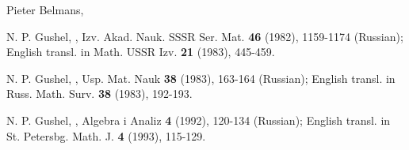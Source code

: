 \documentclass[11pt]{amsart}
\theoremstyle{plain}
\theoremstyle{definition}
\theoremstyle{expl}
\begin{document}
\begin{thebibliography}{12}
Pieter Belmans,

N. P. Gushel,
,
\newblock Izv. Akad. Nauk. SSSR Ser. Mat. \textbf{46} (1982), 1159-1174 (Russian); English transl. in Math. USSR  Izv. \textbf{21} (1983), 445-459.

N. P. Gushel,
,
\newblock Usp. Mat. Nauk \textbf{38} (1983), 163-164 (Russian); English transl. in Russ. Math. Surv. \textbf{38} (1983), 192-193. 

N. P. Gushel,
,
\newblock Algebra i Analiz \textbf{4} (1992), 120-134 (Russian); English transl. in St. Petersbg. Math. J. \textbf{4} (1993), 115-129. 


\end{thebibliography}
\end{document}
